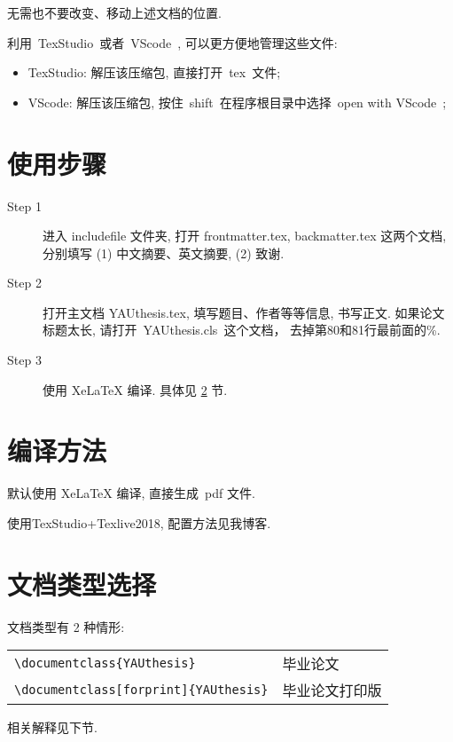 \documentclass[forprint]{YAUthesis}
\begin{document}
无需也不要改变、移动上述文档的位置.


利用~TexStudio~或者~VScode~, 可以更方便地管理这些文件:
\begin{itemize}
    \item TexStudio: 解压该压缩包, 直接打开~tex~文件;
    \item VScode: 解压该压缩包, 按住~shift~在程序根目录中选择~open with VScode~;
\end{itemize} 

 \section{使用步骤}

 \begin{description}

  \item[Step 1]  进入 includefile 文件夹,  打开 frontmatter.tex, backmatter.tex 这两个文档,
        分别填写 (1) 中文摘要、英文摘要, (2) 致谢.

  \item[Step 2]  打开主文档 YAUthesis.tex, 填写题目、作者等等信息, 书写正文. 如果论文标题太长, 请打开~YAUthesis.cls~这个文档， 去掉第80和81行最前面的\%.

  \item[Step 3]  使用 XeLaTeX 编译. 具体见 \ref{sec-compile} 节.


\end{description}


\section{编译方法} \label{sec-compile}

默认使用 XeLaTeX 编译, 直接生成~pdf 文件.

使用TexStudio+Texlive2018, 配置方法见我博客.




\section{文档类型选择}
文档类型有 2 种情形:

\begin{table}[ht]\centering
\begin{tabular}{ll}
\hline
   \verb|\documentclass{YAUthesis}|                     &  毕业论文 \\
   \verb|\documentclass[forprint]{YAUthesis}|        &  毕业论文打印版 \\
\hline
\end{tabular}
\end{table}
相关解释见下节.
\end{document}
